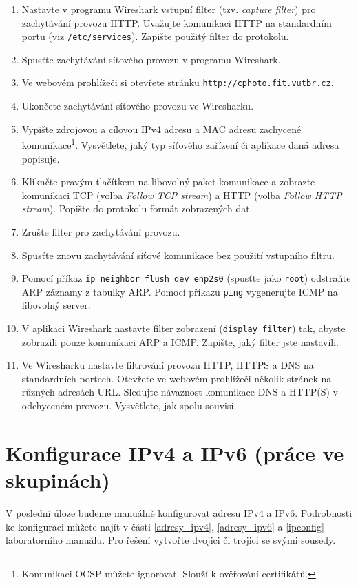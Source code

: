 \documentclass[a4paper,11pt]{article}
\begin{document}
\begin{enumerate}
  \item Nastavte v programu Wireshark vstupní filter (tzv. {\em capture filter}) pro zachytávání provozu HTTP. Uvažujte komunikaci HTTP na standardním portu (viz {\tt /etc/services}). Zapište použitý filter do protokolu.
  \item Spusťte zachytávání síťového provozu v programu Wireshark.
  \item Ve webovém prohlížeči si otevřete stránku \texttt{http://cphoto.fit.vutbr.cz}.
  \item Ukončete zachytávání síťového provozu ve Wiresharku. 
  \item Vypište zdrojovou a cílovou IPv4 adresu a MAC adresu zachycené komunikace\footnote{Komunikaci OCSP můžete ignorovat. Slouží k ověřování certifikátů.}. Vysvětlete, jaký typ síťového zařízení či aplikace daná adresa popisuje.
  \item Klikněte pravým tlačítkem na libovolný paket komunikace a zobrazte komunikaci TCP (volba {\em Follow TCP stream}) a HTTP (volba {\em Follow HTTP stream}). Popište do protokolu formát zobrazených dat. 
  \item Zrušte filter pro zachytávání provozu.
  \item Spusťte znovu zachytávání síťové komunikace bez použití vstupního filtru.
  \item Pomocí příkaz \texttt{ip neighbor flush dev enp2s0} (spusťte jako {\tt root}) odstraňte ARP záznamy z tabulky ARP. Pomocí příkazu {\tt ping} vygenerujte ICMP na libovolný server.
  \item V aplikaci Wireshark nastavte filter zobrazení ({\tt display filter}) tak, abyste zobrazili pouze komunikaci ARP a ICMP. Zapište, jaký filter jste nastavili.
  \item Ve Wiresharku nastavte filtrování provozu HTTP, HTTPS a DNS na standardních portech. Otevřete ve webovém prohlížeči několik stránek na různých adresách URL. Sledujte návaznost komunikace DNS a HTTP(S) v odchyceném provozu. Vysvětlete, jak spolu souvisí. 
\end{enumerate}

\section{Konfigurace IPv4 a IPv6 (práce ve skupinách)}
V poslední úloze budeme manuálně konfigurovat adresu IPv4 a IPv6. Podrobnosti ke konfiguraci můžete najít v části \ref{adresy_ipv4}, \ref{adresy_ipv6} a \ref{ipconfig} laboratorního manuálu. Pro řešení vytvořte dvojici či trojici se svými sousedy.
\end{document}
